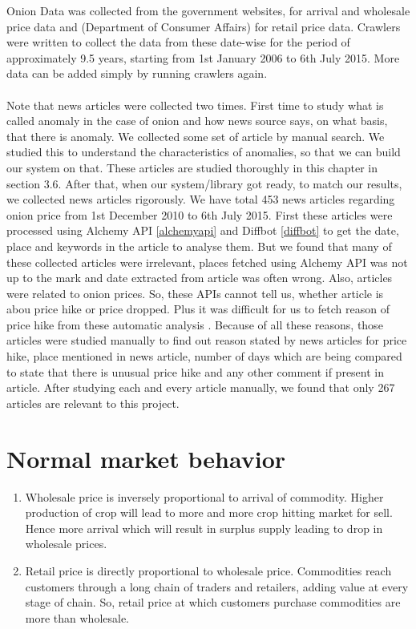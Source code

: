 Onion Data was collected from the government websites,\cite{agmarknet} for arrival and wholesale price data and \cite{retailpricecollection} (Department of Consumer Affairs) for retail price data. Crawlers were written to collect the data from these date-wise for the period of approximately 9.5 years, starting from 1st January 2006 to 6th July 2015. More data can be added simply by running crawlers again.\\
\\
Note that news articles were collected two times. First time to study what is called anomaly in the case of onion and how news source says, on what basis, that there is anomaly. We collected some set of article by manual search. We studied this to understand the characteristics of anomalies, so that we can build our system on that. These articles are studied thoroughly in this chapter in section 3.6. After that, when our system/library got ready, to match our results, we collected news articles rigorously. We have total 453 news articles regarding onion price from 1st December 2010 to 6th July 2015. First these articles were processed using Alchemy API \ref{alchemyapi} and Diffbot \ref{diffbot} to get the date, place and keywords in the article to analyse them. But we found that many of these collected articles were irrelevant, places fetched using Alchemy API was not up to the mark and date extracted from article was often wrong. Also, articles were related to onion prices. So, these APIs cannot tell us, whether article is abou price hike or price dropped. Plus it was difficult for us to fetch reason of price hike from these automatic analysis
. Because of all these reasons, those articles were studied manually to find out reason stated by news articles for price hike, place mentioned in news article, number of days which are being compared to state that there is unusual price hike and any other comment if present in article. After studying each and every article manually, we found that only 267 articles are relevant to this project.


\section{Normal market behavior}

\begin{enumerate}

\item Wholesale price is inversely proportional to arrival of commodity. Higher production of crop will lead to more and more crop hitting market for sell. Hence more arrival which will result in surplus supply leading to drop in wholesale prices.

\item  Retail price is directly proportional to wholesale price. Commodities reach customers through a long chain of traders and retailers, adding value at every stage of chain. So, retail price at which customers purchase commodities are more than wholesale.

\end{enumerate}

